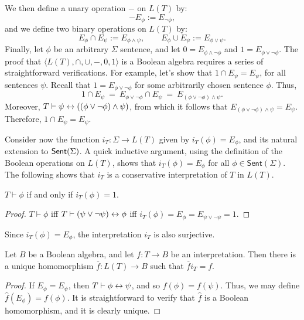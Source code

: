 \noindent We then define a unary operation $-$ on $L(T)$ by:
\[ -E_{\phi } := E_{\neg \phi } , \] and we define two binary
operations on $L(T)$ by: \[ E_\phi\cap E_\psi := E_{\phi\wedge \psi }
,\qquad E_\phi\cup E_\psi := E_{\phi\vee \psi } .\] Finally, let
$\phi$ be an arbitrary $\Sigma$ sentence, and let
$0=E_{\phi\wedge\neg\phi}$ and $1=E_{\phi\vee\neg\phi}$.  The proof
that $\langle L(T),\cap ,\cup ,-,0,1\rangle$ is a Boolean algebra
requires a series of straightforward verifications.  For example,
let's show that $1\cap E_\psi =E_\psi$, for all sentences $\psi$.
Recall that $1=E_{\phi\vee\neg \phi}$ for some arbitrarily chosen
sentence $\phi$.  Thus,
\[ 1\cap E_\psi \: = \: E_{\phi\vee\neg\phi}\cap E_\psi \: = \:
E_{(\phi\vee\neg\phi)\wedge \psi} .\] Moreover, $T\vdash \psi\leftrightarrow
((\phi\vee\neg\phi )\wedge \psi )$, from which it follows that
$E_{(\phi\vee\neg \phi )\wedge \psi }=E_\psi$. Therefore, $1\cap
E_\psi=E_\psi$.

Consider now the function $i_T:\Sigma\to L(T)$ given by $i_T(\phi
)=E_\phi$, and its natural extension to $\mathsf{Sent}(\Sigma )$.  A quick inductive
argument, using the definition of the Boolean operations on $L(T)$,
shows that $i_T (\phi )=E_\phi$ for all $\phi\in \mathsf{Sent}(\Sigma
)$.  The following shows that $i_T$ is a conservative interpretation
of $T$ in $L(T)$.

\begin{prop} $T\vdash\phi$ if and only if $i_T (\phi )=1$.  \end{prop}


\begin{proof} $T\vdash \phi$ iff $T\vdash (\psi\vee\neg\psi )\leftrightarrow
  \phi$ iff $i_T (\phi )=E_\phi=E_{\psi\vee\neg \psi}=1$. \end{proof}

Since $i_T(\phi )=E_\phi$, the interpretation $i_T$ is also
surjective.

\begin{prop} Let $B$ be a Boolean algebra, and let $f:T\to B$ be an
  interpretation.  Then there is a unique homomorphism
  $\overline{f}:L(T)\to B$ such that $\overline{f}i_T=f$.  \end{prop}

\begin{proof} If $E_\phi=E_\psi$, then $T\vdash \phi\leftrightarrow\psi$, and so
  $f(\phi )=f(\psi )$.  Thus, we may define $\hat{f}(E_\phi )=f(\phi
  )$.  It is straightforward to verify that $\hat{f}$ is a Boolean
  homomorphism, and it is clearly unique.
\end{proof}


